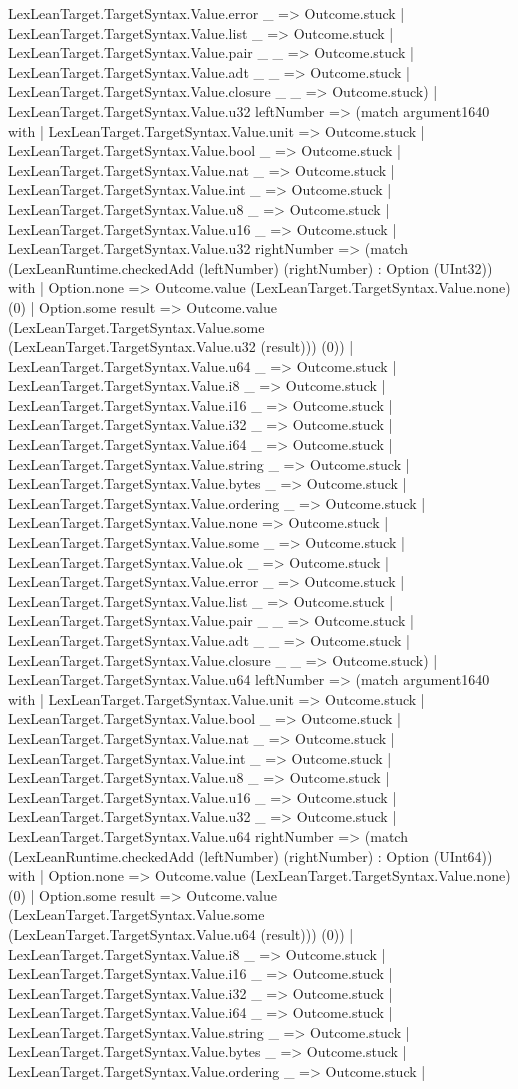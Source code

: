 \documentclass[11pt]{article}
\begin{document}
LexLeanTarget.TargetSyntax.Value.error \_ => Outcome.stuck | LexLeanTarget.TargetSyntax.Value.list \_ => Outcome.stuck | LexLeanTarget.TargetSyntax.Value.pair \_ \_ => Outcome.stuck | LexLeanTarget.TargetSyntax.Value.adt \_ \_ => Outcome.stuck | LexLeanTarget.TargetSyntax.Value.closure \_ \_ => Outcome.stuck) | LexLeanTarget.TargetSyntax.Value.u32 leftNumber => (match argument1640 with | LexLeanTarget.TargetSyntax.Value.unit => Outcome.stuck | LexLeanTarget.TargetSyntax.Value.bool \_ => Outcome.stuck | LexLeanTarget.TargetSyntax.Value.nat \_ => Outcome.stuck | LexLeanTarget.TargetSyntax.Value.int \_ => Outcome.stuck | LexLeanTarget.TargetSyntax.Value.u8 \_ => Outcome.stuck | LexLeanTarget.TargetSyntax.Value.u16 \_ => Outcome.stuck | LexLeanTarget.TargetSyntax.Value.u32 rightNumber => (match (LexLeanRuntime.checkedAdd (leftNumber) (rightNumber) : Option (UInt32)) with | Option.none => Outcome.value (LexLeanTarget.TargetSyntax.Value.none) (0) | Option.some result => Outcome.value (LexLeanTarget.TargetSyntax.Value.some (LexLeanTarget.TargetSyntax.Value.u32 (result))) (0)) | LexLeanTarget.TargetSyntax.Value.u64 \_ => Outcome.stuck | LexLeanTarget.TargetSyntax.Value.i8 \_ => Outcome.stuck | LexLeanTarget.TargetSyntax.Value.i16 \_ => Outcome.stuck | LexLeanTarget.TargetSyntax.Value.i32 \_ => Outcome.stuck | LexLeanTarget.TargetSyntax.Value.i64 \_ => Outcome.stuck | LexLeanTarget.TargetSyntax.Value.string \_ => Outcome.stuck | LexLeanTarget.TargetSyntax.Value.bytes \_ => Outcome.stuck | LexLeanTarget.TargetSyntax.Value.ordering \_ => Outcome.stuck | LexLeanTarget.TargetSyntax.Value.none => Outcome.stuck | LexLeanTarget.TargetSyntax.Value.some \_ => Outcome.stuck | LexLeanTarget.TargetSyntax.Value.ok \_ => Outcome.stuck | LexLeanTarget.TargetSyntax.Value.error \_ => Outcome.stuck | LexLeanTarget.TargetSyntax.Value.list \_ => Outcome.stuck | LexLeanTarget.TargetSyntax.Value.pair \_ \_ => Outcome.stuck | LexLeanTarget.TargetSyntax.Value.adt \_ \_ => Outcome.stuck | LexLeanTarget.TargetSyntax.Value.closure \_ \_ => Outcome.stuck) | LexLeanTarget.TargetSyntax.Value.u64 leftNumber => (match argument1640 with | LexLeanTarget.TargetSyntax.Value.unit => Outcome.stuck | LexLeanTarget.TargetSyntax.Value.bool \_ => Outcome.stuck | LexLeanTarget.TargetSyntax.Value.nat \_ => Outcome.stuck | LexLeanTarget.TargetSyntax.Value.int \_ => Outcome.stuck | LexLeanTarget.TargetSyntax.Value.u8 \_ => Outcome.stuck | LexLeanTarget.TargetSyntax.Value.u16 \_ => Outcome.stuck | LexLeanTarget.TargetSyntax.Value.u32 \_ => Outcome.stuck | LexLeanTarget.TargetSyntax.Value.u64 rightNumber => (match (LexLeanRuntime.checkedAdd (leftNumber) (rightNumber) : Option (UInt64)) with | Option.none => Outcome.value (LexLeanTarget.TargetSyntax.Value.none) (0) | Option.some result => Outcome.value (LexLeanTarget.TargetSyntax.Value.some (LexLeanTarget.TargetSyntax.Value.u64 (result))) (0)) | LexLeanTarget.TargetSyntax.Value.i8 \_ => Outcome.stuck | LexLeanTarget.TargetSyntax.Value.i16 \_ => Outcome.stuck | LexLeanTarget.TargetSyntax.Value.i32 \_ => Outcome.stuck | LexLeanTarget.TargetSyntax.Value.i64 \_ => Outcome.stuck | LexLeanTarget.TargetSyntax.Value.string \_ => Outcome.stuck | LexLeanTarget.TargetSyntax.Value.bytes \_ => Outcome.stuck | LexLeanTarget.TargetSyntax.Value.ordering \_ => Outcome.stuck | 
\end{document}
